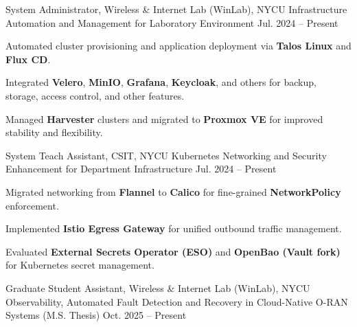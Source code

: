 
\begin{cventries}

    
  \cventry
  {System Administrator, Wireless \& Internet Lab (WinLab), NYCU} %
  {Infrastructure Automation and Management for Laboratory Environment} %
  {} %
  {Jul. 2024 -- Present} %
  {
    \begin{cvitems}
      \item {Automated cluster provisioning and application deployment via \textbf{Talos Linux} and \textbf{Flux CD}.}
      \item {Integrated \textbf{Velero}, \textbf{MinIO}, \textbf{Grafana}, \textbf{Keycloak}, and others for backup, storage, access control, and other features.}
      \item {Managed \textbf{Harvester} clusters and migrated to \textbf{Proxmox VE} for improved stability and flexibility.}
    \end{cvitems}
  }
  \cventry
  {System Teach Assistant, CSIT, NYCU} %
  {Kubernetes Networking and Security Enhancement for Department Infrastructure} %
  {} %
  {Jul. 2024 -- Present} %
  {
    \begin{cvitems}
      \item {Migrated networking from \textbf{Flannel} to \textbf{Calico} for fine-grained \textbf{NetworkPolicy} enforcement.}
      \item { Implemented \textbf{Istio Egress Gateway} for unified outbound traffic management.}
      \item {Evaluated \textbf{External Secrets Operator (ESO)} and \textbf{OpenBao (Vault fork)} for Kubernetes secret management.}
    \end{cvitems}
  }
  \cventry
    {Graduate Student Assistant, Wireless \& Internet Lab (WinLab), NYCU} %
    {Observability, Automated Fault Detection and Recovery in Cloud-Native O-RAN Systems (M.S. Thesis)} %
    {} %
    {Oct. 2025 -- Present} %

\end{cventries}
